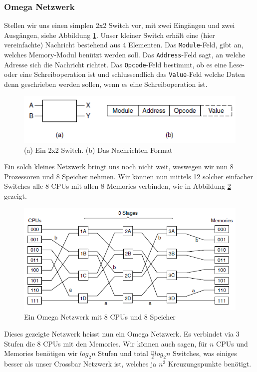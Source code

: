 \subsubsection{Omega Netzwerk}
Stellen wir uns einen simplen 2x2 Switch vor, mit zwei Eingängen und zwei Ausgängen, siehe Abbildung \ref{fig:omegaswitch}. Unser kleiner Switch erhält eine (hier vereinfachte) Nachricht bestehend aus 4 Elementen. Das \texttt{Module}-Feld, gibt an, welches Memory-Modul benützt werden soll. Das \texttt{Address}-Feld sagt, an welche Adresse sich die Nachricht richtet. Das \texttt{Opcode}-Feld bestimmt, ob es eine Lese- oder eine Schreiboperation ist und schlussendlich das \texttt{Value}-Feld welche Daten denn geschrieben werden sollen, wenn es eine Schreiboperation ist.
\begin{figure}
\centering
\includegraphics[width=0.7\linewidth]{"fig/omega switch"}
\caption{(a) Ein 2x2 Switch. (b) Das Nachrichten Format}
\label{fig:omegaswitch}
\end{figure}

Ein solch kleines Netzwerk bringt uns noch nicht weit, weswegen wir nun 8 Prozessoren und 8 Speicher nehmen. Wir können nun mittels 12 solcher einfacher Switches alle 8 CPUs mit allen 8 Memories verbinden, wie in Abbildung \ref{fig:omega_gross} gezeigt.
\begin{figure}
\centering
\includegraphics[width=0.7\linewidth]{fig/omega_gross}
\caption{Ein Omega Netzwerk mit 8 CPUs und 8 Speicher}
\label{fig:omega_gross}
\end{figure}
Dieses gezeigte Netzwerk heisst nun ein Omega Netzwerk. Es verbindet via 3 Stufen die 8 CPUs mit den Memories. Wir können auch sagen, für $ n $ CPUs und Memories benötigen wir $ log_{2} n $ Stufen und total $ \frac{n}{2} log_{2}n $ Switches, was einiges besser als unser Crossbar Netzwerk ist, welches ja $ n^{2} $ Kreuzungspunkte benötigt.

